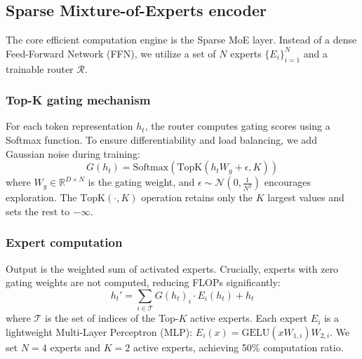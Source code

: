 \documentclass[review,3p,times,draft]{elsarticle}
\begin{document}
\subsection{Sparse Mixture-of-Experts encoder}
The core efficient computation engine is the Sparse MoE layer. Instead of a dense Feed-Forward Network (FFN), we utilize a set of $N$ experts $\{E_i\}_{i=1}^N$ and a trainable router $\mathcal{R}$.

\subsubsection{Top-K gating mechanism}
For each token representation $h_t$, the router computes gating scores using a Softmax function. To ensure differentiability and load balancing, we add Gaussian noise during training:
\begin{equation}
    G(h_t) = \text{Softmax}(\text{TopK}(h_t W_g + \epsilon, K))
\end{equation}
where $W_g \in \mathbb{R}^{D \times N}$ is the gating weight, and $\epsilon \sim \mathcal{N}(0, \frac{1}{N^2})$ encourages exploration. The $\text{TopK}(\cdot, K)$ operation retains only the $K$ largest values and sets the rest to $-\infty$.

\subsubsection{Expert computation}
Output is the weighted sum of activated experts. Crucially, experts with zero gating weights are not computed, reducing FLOPs significantly:
\begin{equation}
    h_t' = \sum_{i \in \mathcal{T}} G(h_t)_i \cdot E_i(h_t) + h_t
\end{equation}
where $\mathcal{T}$ is the set of indices of the Top-$K$ active experts. Each expert $E_i$ is a lightweight Multi-Layer Perceptron (MLP): $E_i(x) = \text{GELU}(x W_{1,i}) W_{2,i}$. We set $N=4$ experts and $K=2$ active experts, achieving 50\% computation ratio.
\end{document}
